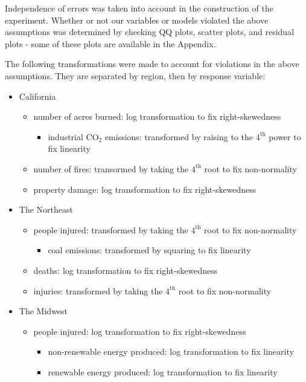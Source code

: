 \documentclass[10pt,]{article}
\begin{document}
Independence of errors was taken into account in the construction of the
experiment. Whether or not our variables or models violated the above
assumptions was determined by checking QQ plots, scatter plots, and
residual plots - some of these plots are available in the Appendix.

The following transformations were made to account for violations in the
above assumptions. They are separated by region, then by response
variable:

\begin{itemize}
  \item California
  \begin{itemize}
    \item number of acres burned: log transformation to fix right-skewedness
    \begin{itemize}
      \item industrial CO$_2$ emissions: transformed by raising to the $4^{\text{th}}$ power to fix linearity
    \end{itemize}
    \item number of fires: transormed by taking the $4^{\text{th}}$ root to fix non-normality
    \item property damage: log transformation to fix right-skewedness
  \end{itemize}
  \item The Northeast
  \begin{itemize}
    \item people injured: transformed by taking the $4^{\text{th}}$ root to fix non-normality
    \begin{itemize}
      \item coal emissions: transformed by squaring to fix linearity
    \end{itemize}
    \item deaths: log transformation to fix right-skewedness
    \item injuries: transformed by taking the $4^{\text{th}}$ root to fix non-normality
  \end{itemize}
  \item The Midwest
  \begin{itemize}
    \item people injured: log transformation to fix right-skewedness
    \begin{itemize}
      \item non-renewable energy produced: log transformation to fix linearity
      \item renewable energy produced: log transformation to fix linearity

\end{itemize}
\end{itemize}
\end{itemize}
\end{document}
